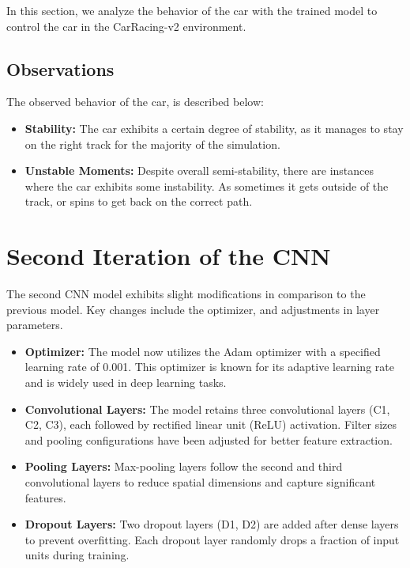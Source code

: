 \documentclass{article}
\begin{document}
In this section, we analyze the behavior of the car with the trained model to control the car in the CarRacing-v2 environment.

\subsection{Observations}

The observed behavior of the car, is described below:

\begin{itemize}
    \item \textbf{Stability:} The car exhibits a certain degree of stability, as it manages to stay on the right track for the majority of the simulation.

    \item \textbf{Unstable Moments:} Despite overall semi-stability, there are instances where the car exhibits some instability. As sometimes it gets outside of the track, or spins to get back on the correct path.

\end{itemize}

\section{Second Iteration of the CNN}

The second CNN model exhibits slight modifications in comparison to the previous model. Key changes include the optimizer, and adjustments in layer parameters.

\begin{itemize}
    \item \textbf{Optimizer:} The model now utilizes the Adam optimizer with a specified learning rate of 0.001. This optimizer is known for its adaptive learning rate and is widely used in deep learning tasks.

    \item \textbf{Convolutional Layers:} The model retains three convolutional layers (C1, C2, C3), each followed by rectified linear unit (ReLU) activation. Filter sizes and pooling configurations have been adjusted for better feature extraction.

    \item \textbf{Pooling Layers:} Max-pooling layers follow the second and third convolutional layers to reduce spatial dimensions and capture significant features.

    \item \textbf{Dropout Layers:} Two dropout layers (D1, D2) are added after dense layers to prevent overfitting. Each dropout layer randomly drops a fraction of input units during training.

\end{itemize}
\end{document}
